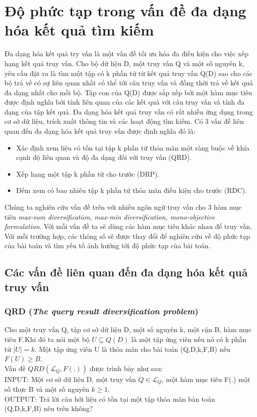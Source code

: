\documentclass[12pt]{report}
\begin{document}
\section{Độ phức tạp trong vấn đề đa dạng hóa kết quả tìm kiếm}
Đa dạng hóa kết quả try vấn là một vấn đề tối ưu hóa đa điều kiện cho việc xếp hạng kết quả truy  vấn. Cho bộ dữ liệu D, một truy vấn Q và một số nguyên k, yêu cầu đặt ra là tìm một tập có k phần tử từ kết quả truy vấn Q(D) sao cho các bộ trả về có sự liên quan nhất có thể tới câu truy vấn và đồng thời trả về kết quả đa dạng nhất cho mỗi bộ. Tập con của Q(D) được sắp xếp bởi một hàm mục tiêu được định nghĩa bởi tính liên quan của các kết quả với câu truy vấn và tính đa dạng của tập kết quả. Đa dạng hóa kết quả truy vấn có rất nhiều ứng dụng trong cơ sở dữ liệu, trích xuất thông tin và các hoạt động tìm kiếm.
Có 3 vấn đề liên quan đến đa dạng hóa kết quả truy vấn được định nghĩa đó là:
  \begin{itemize}
  \item Xác định xem liệu có tồn tại tập k phần tử thỏa mãn một ràng buộc về khía cạnh độ liên quan và độ đa dạng đối với truy vấn (QRD).
  \item Xếp hạng một tập k phần tử cho trước (DRP).
  \item Đếm xem có bao nhiêu tập k phần tử thỏa mãn điều kiện cho trước (RDC).
  \end{itemize}
Chúng ta nghiên cứu vấn đề trên với nhiều ngôn ngữ truy vấn cho 3 hàm mục tiêu \textit{max-sum diversification, max-min diversification, mono-objective formulation}.
Với mỗi vấn đề ta sẽ dùng các hàm mục tiêu khác nhau để truy vấn. Với mỗi trường hợp, các thông số sẽ được thay đổi để nghiên cứu về độ phức tạp của bài toán và tìm yếu tố ảnh hưởng tới độ phức tạp của bài toán. 
\subsection{Các vấn đề liên quan đến đa dạng hóa kết quả truy vấn}
	\subsubsection{QRD  (\textit{The query result diversification problem}) }
	Cho một truy vấn Q, tập cơ sở dữ liệu D, một số nguyên k, một cận B, hàm mục tiêu F.Khi đó ta nói một bộ $ U \subseteq Q(D) $ là một tập ứng viên nếu nó có k phần tử $|U| = k$. Một tập ứng viên U là thỏa mãn cho bài toán (Q,D,k,F,B) nếu $F(U) \ge B$.\\
	Vấn đề $QRD(\mathcal{L}_Q,F(.))$ được trình bày như sau: \\
	INPUT: 	Một cơ sở dữ liệu D, một truy vấn $Q\in \mathcal{L}_Q$, một hàm mục tiêu F(.) một số thực B và một số nguyên $k\ge1$.\\
	OUTPUT: Trả lời câu hởi liệu có tồn tại một tập thỏa mãn bàn toán (Q,D,k,F,B) nêu trên không?
\end{document}
